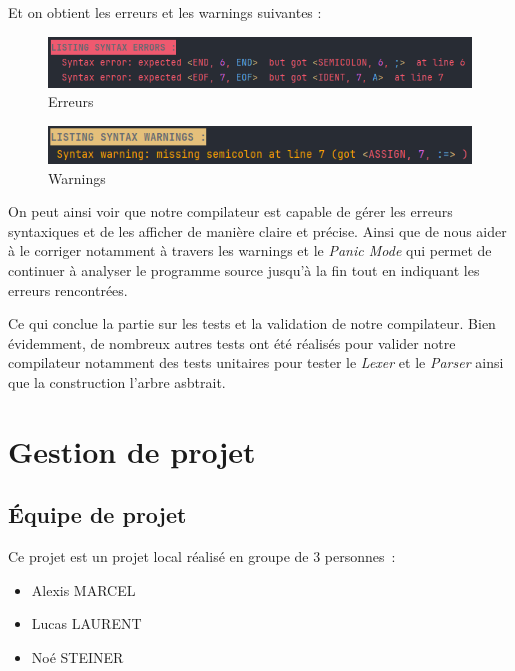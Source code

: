 \documentclass[french,a4paper]{article}
\begin{document}
    Et on obtient les erreurs et les warnings suivantes :

    \begin{figure}[H]
        \centering
        \includegraphics[width=1\textwidth]{syntax_err}
        \caption{Erreurs}\label{fig:figure8}
    \end{figure}

    \begin{figure}[H]
        \centering
        \includegraphics[width=1\textwidth]{syntax_warn}
        \caption{Warnings}\label{fig:figure9}
    \end{figure}

    On peut ainsi voir que notre compilateur est capable de gérer les erreurs syntaxiques et de les afficher de manière claire et précise.
    Ainsi que de nous aider à le corriger notamment à travers les warnings et le \textit{Panic Mode} qui permet de continuer à analyser le programme source jusqu'à la fin tout en indiquant les erreurs rencontrées.

    Ce qui conclue la partie sur les tests et la validation de notre compilateur.
    Bien évidemment, de nombreux autres tests ont été réalisés pour valider notre compilateur notamment des tests unitaires pour tester le \textit{Lexer} et le \textit{Parser} ainsi que la construction l'arbre asbtrait.

    \section{Gestion de projet}\label{sec:gestion-de-projet}

    \subsection{Équipe de projet}\label{subsec:equipe-de-projet}
    Ce projet est un projet local réalisé en groupe de 3 personnes~:
    \begin{itemize}
        \item Alexis MARCEL
        \item Lucas LAURENT
        \item Noé STEINER
    \end{itemize}
\end{document}
